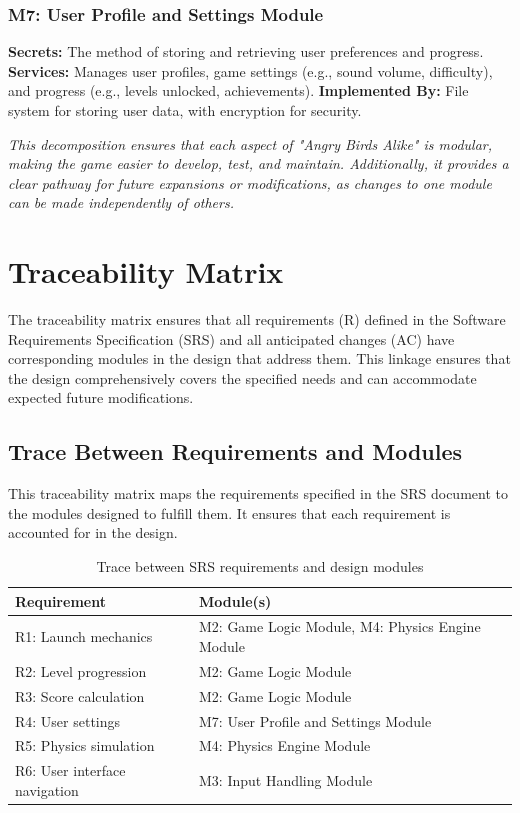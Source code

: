 \documentclass[12pt]{article}
\begin{document}
\subsubsection{M7: User Profile and Settings Module}
\textbf{Secrets:} The method of storing and retrieving user preferences and progress.
\textbf{Services:} Manages user profiles, game settings (e.g., sound volume, difficulty), and progress (e.g., levels unlocked, achievements).
\textbf{Implemented By:} File system for storing user data, with encryption for security.

\textit{This decomposition ensures that each aspect of "Angry Birds Alike" is modular, making the game easier to develop, test, and maintain. Additionally, it provides a clear pathway for future expansions or modifications, as changes to one module can be made independently of others.}

\section{Traceability Matrix}

The traceability matrix ensures that all requirements (R) defined in the Software Requirements Specification (SRS) and all anticipated changes (AC) have corresponding modules in the design that address them. This linkage ensures that the design comprehensively covers the specified needs and can accommodate expected future modifications.

\subsection{Trace Between Requirements and Modules}

This traceability matrix maps the requirements specified in the SRS document to the modules designed to fulfill them. It ensures that each requirement is accounted for in the design.

\begin{table}[H]
\centering
\begin{tabular}{|l|l|}
\hline
\textbf{Requirement} & \textbf{Module(s)} \\ \hline
R1: Launch mechanics & M2: Game Logic Module, M4: Physics Engine Module \\ \hline
R2: Level progression & M2: Game Logic Module \\ \hline
R3: Score calculation & M2: Game Logic Module \\ \hline
R4: User settings & M7: User Profile and Settings Module \\ \hline
R5: Physics simulation & M4: Physics Engine Module \\ \hline
R6: User interface navigation & M3: Input Handling Module \\ \hline
\end{tabular}
\caption{Trace between SRS requirements and design modules}
\end{table}
\end{document}
